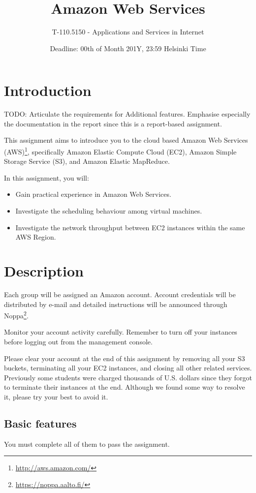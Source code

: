 \documentclass[12pt, a4paper]{article}
\title{Amazon Web Services}
\author{T-110.5150 - Applications and Services in Internet}
\date{Deadline: 00th of Month 201Y, 23:59 Helsinki Time}
\newcommand{\TODO}[1]{\noindent\colorbox{aaltoYellow}{\color{black} TODO: #1}}
\begin{document}
\maketitle
\section{Introduction}

\TODO{} Articulate the requirements for Additional features. Emphasise especially the documentation in the report since this is a report-based assignment.

This assignment aims to introduce you to the cloud based Amazon Web Services (AWS)\footnote{\url{http://aws.amazon.com/}}, specifically Amazon Elastic Compute Cloud (EC2), Amazon Simple Storage Service (S3), and Amazon Elastic MapReduce.

In this assignment, you will:
\begin{itemize}
\item Gain practical experience in Amazon Web Services.
\item Investigate the scheduling behaviour among virtual machines.
\item Investigate the network throughput between EC2 instances within the same AWS Region.
\end{itemize}

\section{Description}
Each group will be assigned an Amazon account.
Account credentials will be distributed by e-mail and detailed instructions will be announced through Noppa\footnote{\url{https://noppa.aalto.fi/}}.

Monitor your account activity carefully.
Remember to turn off your instances before logging out from the management console.

Please clear your account at the end of this assignment by removing all your S3 buckets, terminating all your EC2 instances, and closing all other related services.
Previously some students were charged thousands of U.S. dollars since they forgot to terminate their instances at the end.
Although we found some way to resolve it, please try your best to avoid it.


\subsection{Basic features}
You must complete all of them to pass the assignment.
\end{document}
